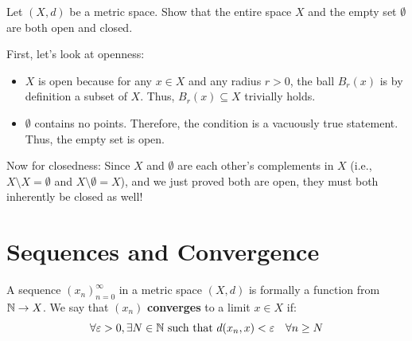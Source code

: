 \begin{center}
\end{center}

\vspace{0.5cm}

\begin{exercise*}
Let $(X,d)$ be a metric space. Show that the entire space $X$ and the empty set $\emptyset$ are both open and closed.
\end{exercise*}

\begin{solution}
First, let's look at openness:
\begin{itemize}
    \item $X$ is open because for any $x \in X$ and any radius $r > 0$, the ball $B_r(x)$ is by definition a subset of $X$. Thus, $B_r(x) \subseteq X$ trivially holds.
    \item $\emptyset$ contains no points. Therefore, the condition  is a vacuously true statement. Thus, the empty set is open.
\end{itemize}
Now for closedness:
Since $X$ and $\emptyset$ are each other's complements in $X$ (i.e., $X \setminus X = \emptyset$ and $X \setminus \emptyset = X$), and we just proved both are open, they must both inherently be closed as well!
\end{solution}

\hrulefill

\section{Sequences and Convergence}

A sequence $(x_n)_{n=0}^\infty$ in a metric space $(X, d)$ is formally a function from $\mathbb{N} \to X$. We say that $(x_n)$ \textbf{converges} to a limit $x \in X$ if:
\[ \forall \varepsilon > 0, \exists N \in \mathbb{N} \text{ such that } d(x_n, x) < \varepsilon \quad \forall n \ge N \]

